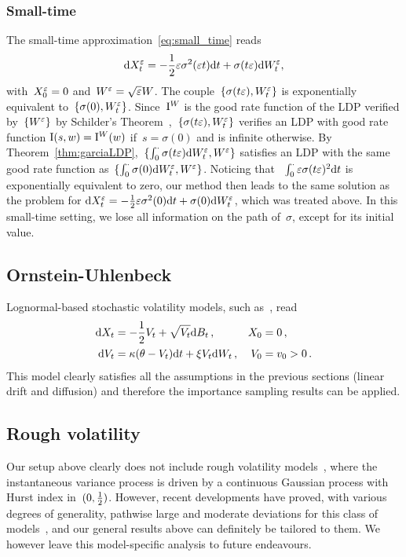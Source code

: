 \subsubsection{Small-time}
The small-time approximation~\eqref{eq:small_time} reads
$$\mathrm{d} X_t^{\varepsilon} = -\frac{1}{2}\varepsilon\sigma^2(\varepsilon t)\mathrm{d} t + \sigma(t\varepsilon) \mathrm{d} W_t^{\varepsilon},$$
with~$X_0 ^{\varepsilon} = 0$ and~$W^{\varepsilon} = \sqrt{\varepsilon}W$.
The couple~$\{\sigma(t\varepsilon), W_t^\varepsilon\}$ is exponentially equivalent to~$\{\sigma(0),W_t^\varepsilon\}$. 
Since~$\mathrm{I}^{W}$ is the good rate function of the LDP verified by~$\{W^\varepsilon\}$ by Schilder's Theorem~\cite[Theorem 5.2.3]{Dembo2010LargeApplications},~$\{\sigma(t\varepsilon), W_t^\varepsilon\}$ verifies an LDP with good rate function
$\mathrm{I}(s,w) = \mathrm{I}^{W}(w)$
if~$s = \sigma(0)$ and is infinite otherwise.
By Theorem~\ref{thm:garciaLDP},~$\{\int_0^\cdot\sigma(t\varepsilon)\mathrm{d} W_t^\varepsilon,W^\varepsilon\}$ satisfies an LDP with the same good rate function as~$\{\int_0^\cdot\sigma(0)\mathrm{d} W_t^\varepsilon,W^\varepsilon\}$. 
Noticing that ~$\int_0^\cdot \varepsilon \sigma(t\varepsilon)^2\mathrm{d} t$ is exponentially equivalent to zero, our method then leads to the same solution as the problem for 
$\mathrm{d} X_t^{\varepsilon} = -\frac{1}{2}\varepsilon\sigma^2(0)\mathrm{d} t + \sigma(0) \mathrm{d} W_t^{\varepsilon}$,
which was treated above. 
In this small-time setting, we lose all information on the path of~$\sigma$, except for its initial value.



\newpage
\subsection{Ornstein-Uhlenbeck}\label{sec:OU}
Lognormal-based stochastic volatility models, 
such as~\cite{Sepp2012BetaModel}, read
\begin{equation}\label{eq:LogNormalVol}
\begin{aligned}
    \mathrm{d} X_t &= -\frac12 V_t + \sqrt{V_t}\mathrm{d} B_t\,, & X_0 &= 0\,,\\
    \mathrm{d} V_t &= \kappa (\theta - V_t)\mathrm{d} t + \xi V_t\mathrm{d} W_t\,, & V_0 &= v_0 > 0\,.
\end{aligned}
\end{equation}
This model clearly satisfies all the assumptions in the previous sections (linear drift and diffusion)
and therefore the importance sampling results can be applied.

\subsection{Rough volatility}\label{sec:RoughVol}
Our setup above clearly does not include rough volatility models~\cite{Gatheral2018VolatilityRough}, where the instantaneous variance process is driven by a continuous Gaussian process with Hurst index in~$(0,\frac{1}{2})$.
However, recent developments have proved, with various degrees of generality,
pathwise large and moderate deviations for this class of models~\cite{Gerhold2021PathwiseCorrigendum, Gulisashvili2018LargeModels, Gulisashvili2021Time-inhomogeneousRoughness, Jacquier2018PathwiseModel, Jacquier2022LargeSystems},
and our general results above can definitely be tailored to them.
We however leave this model-specific analysis to future endeavours.

